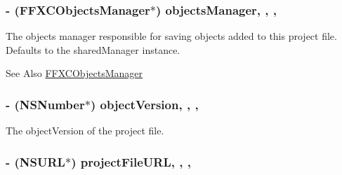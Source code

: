 \hypertarget{interface_f_f_x_c_project_file_ad348c3a1195a98462e17c22c66d89eda}{
\subsubsection[{objects\-Manager}]{\setlength{\rightskip}{0pt plus 5cm}-\/ ({\bf F\-F\-X\-C\-Objects\-Manager}$\ast$) objects\-Manager\hspace{0.3cm}{\ttfamily [read]}, {\ttfamily [write]}, {\ttfamily [nonatomic]}, {\ttfamily [strong]}}}\label{interface_f_f_x_c_project_file_ad348c3a1195a98462e17c22c66d89eda}
The objects manager responsible for saving objects added to this project file. Defaults to the shared\-Manager instance. \begin{DoxySeeAlso}{See Also}
\hyperlink{interface_f_f_x_c_objects_manager}{F\-F\-X\-C\-Objects\-Manager} 
\end{DoxySeeAlso}
\hypertarget{interface_f_f_x_c_project_file_acb8076d99d591d96ebcfc054f245502e}{
\subsubsection[{object\-Version}]{\setlength{\rightskip}{0pt plus 5cm}-\/ (N\-S\-Number$\ast$) object\-Version\hspace{0.3cm}{\ttfamily [read]}, {\ttfamily [write]}, {\ttfamily [nonatomic]}, {\ttfamily [strong]}}}\label{interface_f_f_x_c_project_file_acb8076d99d591d96ebcfc054f245502e}
The object\-Version of the project file. \hypertarget{interface_f_f_x_c_project_file_aa3dfcf55b91beaf8e8d1e9f4d96fafac}{
\subsubsection[{project\-File\-U\-R\-L}]{\setlength{\rightskip}{0pt plus 5cm}-\/ (N\-S\-U\-R\-L$\ast$) project\-File\-U\-R\-L\hspace{0.3cm}{\ttfamily [read]}, {\ttfamily [write]}, {\ttfamily [nonatomic]}, {\ttfamily [strong]}}}\label{interface_f_f_x_c_project_file_aa3dfcf55b91beaf8e8d1e9f4d96fafac}
